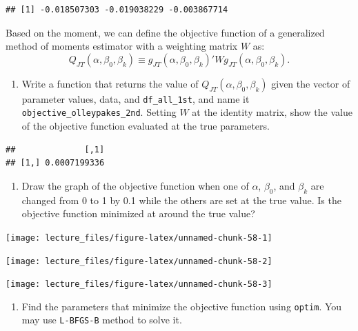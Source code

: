 \documentclass[
]{book}
\providecommand{\tightlist}{%
  \setlength{\itemsep}{0pt}\setlength{\parskip}{0pt}}
\begin{document}
\begin{verbatim}
## [1] -0.018507303 -0.019038229 -0.003867714
\end{verbatim}

Based on the moment, we can define the objective function of a generalized method of moments estimator with a weighting matrix \(W\) as:
\[
Q_{JT}(\alpha, \beta_0, \beta_k) \equiv g_{JT}(\alpha, \beta_0, \beta_k)' W g_{JT}(\alpha, \beta_0, \beta_k).
\]

\begin{enumerate}
\def\labelenumi{\arabic{enumi}.}
\setcounter{enumi}{6}
\tightlist
\item
  Write a function that returns the value of \(Q_{JT}(\alpha, \beta_0, \beta_k)\) given the vector of parameter values, data, and \texttt{df\_all\_1st}, and name it \texttt{objective\_olleypakes\_2nd}. Setting \(W\) at the identity matrix, show the value of the objective function evaluated at the true parameters.
\end{enumerate}

\begin{verbatim}
##              [,1]
## [1,] 0.0007199336
\end{verbatim}

\begin{enumerate}
\def\labelenumi{\arabic{enumi}.}
\setcounter{enumi}{7}
\tightlist
\item
  Draw the graph of the objective function when one of \(\alpha\), \(\beta_0\), and \(\beta_k\) are changed from 0 to 1 by 0.1 while the others are set at the true value. Is the objective function minimized at around the true value?
\end{enumerate}

\begin{center}\texttt{[image: lecture\_files/figure-latex/unnamed-chunk-58-1]} \end{center}

\begin{center}\texttt{[image: lecture\_files/figure-latex/unnamed-chunk-58-2]} \end{center}

\begin{center}\texttt{[image: lecture\_files/figure-latex/unnamed-chunk-58-3]} \end{center}

\begin{enumerate}
\def\labelenumi{\arabic{enumi}.}
\setcounter{enumi}{8}
\tightlist
\item
  Find the parameters that minimize the objective function using \texttt{optim}. You may use \texttt{L-BFGS-B} method to solve it.
\end{enumerate}
\end{document}
